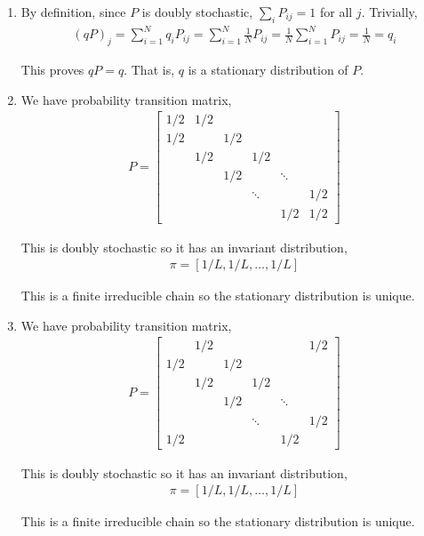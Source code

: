 \begin{solution}[Solution]
\begin{enumerate}[label=(\alph*)]
    \item By definition, since \( P \) is doubly stochastic, \( \sum_i P_{ij} = 1 \) for all \( j \). Trivially,
        \begin{align*}
            (qP)_j = \sum_{i=1}^N q_{i}P_{ij} = \sum_{i=1}^N \frac{1}{N} P_{ij} = \frac{1}{N}\sum_{i=1}^N P_{ij} = \frac{1}{N} = q_i
        \end{align*}

        This proves \( qP = q \). That is, \( q \) is a stationary distribution of \( P \).

    \item We have probability transition matrix,
        \begin{align*}
            P = \left[\begin{array}{cccccc}
                1/2 & 1/2 \\
                1/2 & &1/2 \\
                &1/2 & &1/2 \\
                &&1/2 &  &\ddots \\
                &&&\ddots &&1/2 \\ 
                &&&&1/2 & 1/2
            \end{array}\right]
        \end{align*}
       
        This is doubly stochastic so it has an invariant distribution,
        \begin{align*}
            \pi = [1/L,1/L,\ldots, 1/L]
        \end{align*}

        This is a finite irreducible chain so the stationary distribution is unique.

        
    \item We have probability transition matrix,
        \begin{align*}
            P = \left[\begin{array}{cccccc}
                & 1/2 &&&& 1/2 \\
                1/2 & &1/2 \\
                &1/2 & &1/2 \\
                &&1/2 &  &\ddots \\
                &&&\ddots &&1/2 \\ 
                1/2 &&&&1/2 & 
            \end{array}\right]
        \end{align*}
       
        This is doubly stochastic so it has an invariant distribution,
        \begin{align*}
            \pi = [1/L,1/L,\ldots, 1/L]
        \end{align*}
        
        This is a finite irreducible chain so the stationary distribution is unique.

\end{enumerate}
\end{solution}



